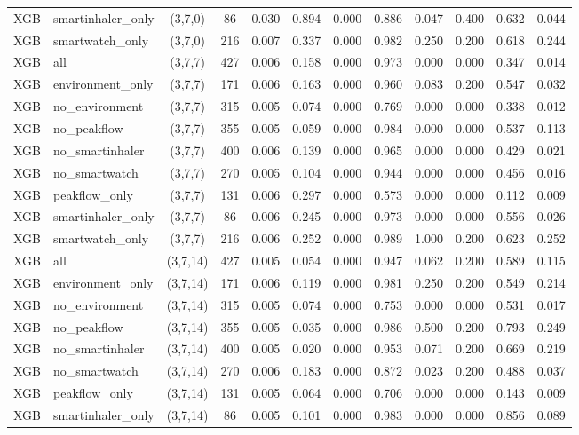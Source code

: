 \begin{longtable}{llcccccccccc}
XGB & smartinhaler\_only & (3,7,0) & 86 & 0.030 & 0.894 & 0.000 & 0.886 & 0.047 & 0.400 & 0.632 & 0.044 \\
XGB & smartwatch\_only & (3,7,0) & 216 & 0.007 & 0.337 & 0.000 & 0.982 & 0.250 & 0.200 & 0.618 & 0.244 \\
XGB & all & (3,7,7) & 427 & 0.006 & 0.158 & 0.000 & 0.973 & 0.000 & 0.000 & 0.347 & 0.014 \\
XGB & environment\_only & (3,7,7) & 171 & 0.006 & 0.163 & 0.000 & 0.960 & 0.083 & 0.200 & 0.547 & 0.032 \\
XGB & no\_environment & (3,7,7) & 315 & 0.005 & 0.074 & 0.000 & 0.769 & 0.000 & 0.000 & 0.338 & 0.012 \\
XGB & no\_peakflow & (3,7,7) & 355 & 0.005 & 0.059 & 0.000 & 0.984 & 0.000 & 0.000 & 0.537 & 0.113 \\
XGB & no\_smartinhaler & (3,7,7) & 400 & 0.006 & 0.139 & 0.000 & 0.965 & 0.000 & 0.000 & 0.429 & 0.021 \\
XGB & no\_smartwatch & (3,7,7) & 270 & 0.005 & 0.104 & 0.000 & 0.944 & 0.000 & 0.000 & 0.456 & 0.016 \\
XGB & peakflow\_only & (3,7,7) & 131 & 0.006 & 0.297 & 0.000 & 0.573 & 0.000 & 0.000 & 0.112 & 0.009 \\
XGB & smartinhaler\_only & (3,7,7) & 86 & 0.006 & 0.245 & 0.000 & 0.973 & 0.000 & 0.000 & 0.556 & 0.026 \\
XGB & smartwatch\_only & (3,7,7) & 216 & 0.006 & 0.252 & 0.000 & 0.989 & 1.000 & 0.200 & 0.623 & 0.252 \\
XGB & all & (3,7,14) & 427 & 0.005 & 0.054 & 0.000 & 0.947 & 0.062 & 0.200 & 0.589 & 0.115 \\
XGB & environment\_only & (3,7,14) & 171 & 0.006 & 0.119 & 0.000 & 0.981 & 0.250 & 0.200 & 0.549 & 0.214 \\
XGB & no\_environment & (3,7,14) & 315 & 0.005 & 0.074 & 0.000 & 0.753 & 0.000 & 0.000 & 0.531 & 0.017 \\
XGB & no\_peakflow & (3,7,14) & 355 & 0.005 & 0.035 & 0.000 & 0.986 & 0.500 & 0.200 & 0.793 & 0.249 \\
XGB & no\_smartinhaler & (3,7,14) & 400 & 0.005 & 0.020 & 0.000 & 0.953 & 0.071 & 0.200 & 0.669 & 0.219 \\
XGB & no\_smartwatch & (3,7,14) & 270 & 0.006 & 0.183 & 0.000 & 0.872 & 0.023 & 0.200 & 0.488 & 0.037 \\
XGB & peakflow\_only & (3,7,14) & 131 & 0.005 & 0.064 & 0.000 & 0.706 & 0.000 & 0.000 & 0.143 & 0.009 \\
XGB & smartinhaler\_only & (3,7,14) & 86 & 0.005 & 0.101 & 0.000 & 0.983 & 0.000 & 0.000 & 0.856 & 0.089 \\

\end{longtable}

